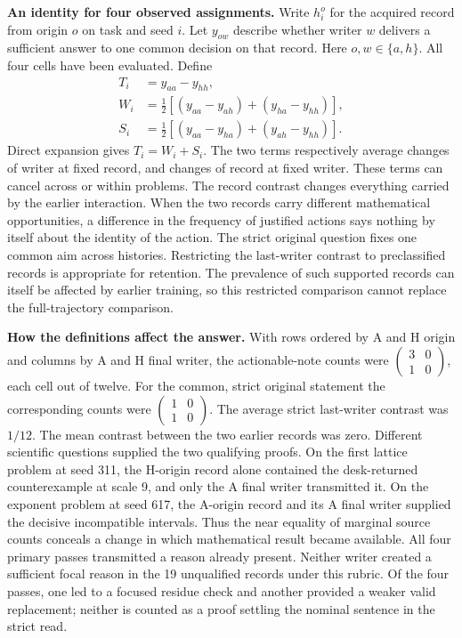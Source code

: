 \documentclass[11pt,a4paper]{article}
\newcommand{\lead}[1]{\textbf{#1}\enspace}
\begin{document}
\lead{An identity for four observed assignments.} Write \(h_i^o\) for the acquired record from origin \(o\) on task and seed \(i\). Let \(y_{ow}\) describe whether writer \(w\) delivers a sufficient answer to one common decision on that record. Here \(o,w\in\{a,h\}\). All four cells have been evaluated. Define
\[
\begin{aligned}
 T_i&=y_{aa}-y_{hh},\\
 W_i&=\tfrac12[(y_{aa}-y_{ah})+(y_{ha}-y_{hh})],\\
 S_i&=\tfrac12[(y_{aa}-y_{ha})+(y_{ah}-y_{hh})].
\end{aligned}
\]
Direct expansion gives \(T_i=W_i+S_i\). The two terms respectively average changes of writer at fixed record, and changes of record at fixed writer. These terms can cancel across or within problems. The record contrast changes everything carried by the earlier interaction. When the two records carry different mathematical opportunities, a difference in the frequency of justified actions says nothing by itself about the identity of the action. The strict original question fixes one common aim across histories. Restricting the last-writer contrast to preclassified records is appropriate for retention. The prevalence of such supported records can itself be affected by earlier training, so this restricted comparison cannot replace the full-trajectory comparison.

\lead{How the definitions affect the answer.} With rows ordered by A and H origin and columns by A and H final writer, the actionable-note counts were \(\left(\begin{smallmatrix}3&0\\1&0\end{smallmatrix}\right)\), each cell out of twelve. For the common, strict original statement the corresponding counts were \(\left(\begin{smallmatrix}1&0\\1&0\end{smallmatrix}\right)\). The average strict last-writer contrast was \(1/12\). The mean contrast between the two earlier records was zero. Different scientific questions supplied the two qualifying proofs. On the first lattice problem at seed 311, the H-origin record alone contained the desk-returned counterexample at scale 9, and only the A final writer transmitted it. On the exponent problem at seed 617, the A-origin record and its A final writer supplied the decisive incompatible intervals. Thus the near equality of marginal source counts conceals a change in which mathematical result became available. All four primary passes transmitted a reason already present. Neither writer created a sufficient focal reason in the 19 unqualified records under this rubric. Of the four passes, one led to a focused residue check and another provided a weaker valid replacement; neither is counted as a proof settling the nominal sentence in the strict read.
\end{document}
